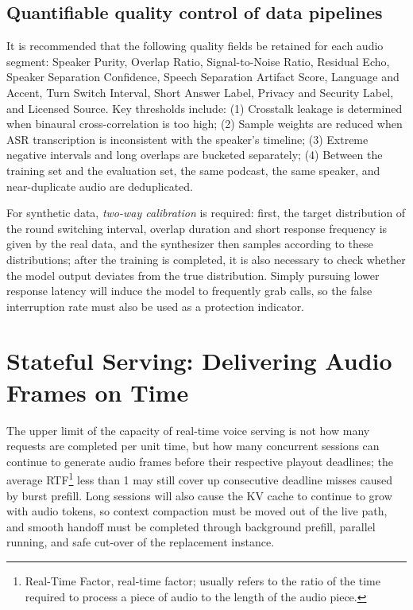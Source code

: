 \documentclass[UTF8,fontset=none,a4paper,10pt]{ctexart}
\begin{document}
\subsection{Quantifiable quality control of data pipelines}

It is recommended that the following quality fields be retained for each audio segment: Speaker Purity, Overlap Ratio, Signal-to-Noise Ratio, Residual Echo, Speaker Separation Confidence, Speech Separation Artifact Score, Language and Accent, Turn Switch Interval, Short Answer Label, Privacy and Security Label, and Licensed Source. Key thresholds include: (1) Crosstalk leakage is determined when binaural cross-correlation is too high; (2) Sample weights are reduced when ASR transcription is inconsistent with the speaker's timeline; (3) Extreme negative intervals and long overlaps are bucketed separately; (4) Between the training set and the evaluation set, the same podcast, the same speaker, and near-duplicate audio are deduplicated.

For synthetic data, \emph{ two-way calibration } is required: first, the target distribution of the round switching interval, overlap duration and short response frequency is given by the real data, and the synthesizer then samples according to these distributions; after the training is completed, it is also necessary to check whether the model output deviates from the true distribution. Simply pursuing lower response latency will induce the model to frequently grab calls, so the false interruption rate must also be used as a protection indicator.

\section{Stateful Serving: Delivering Audio Frames on Time}

The upper limit of the capacity of real-time voice serving is not how many requests are completed per unit time, but how many concurrent sessions can continue to generate audio frames before their respective playout deadlines; the average RTF\footnote{Real-Time Factor, real-time factor; usually refers to the ratio of the time required to process a piece of audio to the length of the audio piece. } less than 1 may still cover up consecutive deadline misses caused by burst prefill. Long sessions will also cause the KV cache to continue to grow with audio tokens, so context compaction must be moved out of the live path, and smooth handoff must be completed through background prefill, parallel running, and safe cut-over of the replacement instance.
\end{document}
